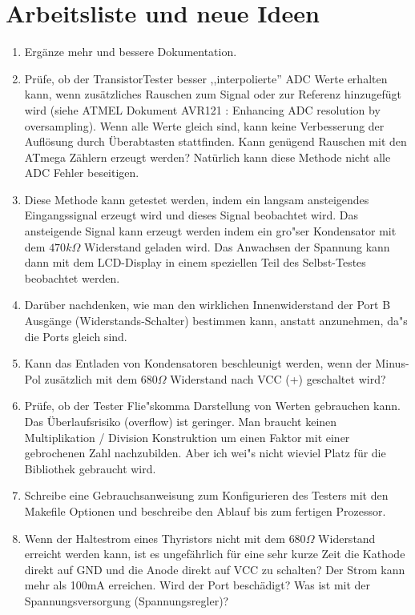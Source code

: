 
\chapter{Arbeitsliste und neue Ideen}
\label{sec:todo}

\begin{enumerate}
\item Erg\"anze mehr und bessere Dokumentation.
\item Pr\"ufe, ob der TransistorTester besser ,,interpolierte''  ADC Werte erhalten kann, wenn zus\"atz\-liches Rauschen zum Signal
oder zur Referenz hinzugef\"ugt wird (siehe ATMEL Dokument AVR121 \cite{AVR121}: Enhancing ADC resolution by oversampling).
Wenn alle Werte gleich sind, kann keine Verbesserung der Aufl\"osung durch \"Uberabtasten stattfinden.
Kann gen\"ugend Rauschen mit den ATmega Z\"ahlern erzeugt werden?
Nat\"urlich kann diese Methode nicht alle ADC Fehler beseitigen.
\item Diese Methode kann getestet werden, indem ein langsam ansteigendes Eingangssignal erzeugt wird und dieses
Signal beobachtet wird.
Das ansteigende Signal kann erzeugt werden indem ein gro"ser Kondensator mit dem \(470k\Omega\) Widerstand geladen wird.
Das Anwachsen der Spannung kann dann mit dem LCD-Display in einem speziellen Teil des Selbst-Testes beobachtet werden.
\item Dar\"uber nachdenken, wie man den wirklichen Innenwiderstand der Port B Aus\-g\"an\-ge (Wider\-stands-Schal\-ter) bestimmen kann,
anstatt anzunehmen, da"s die Ports gleich sind.
\item Kann das Entladen von Kondensatoren beschleunigt werden, wenn der Minus-Pol zus\"atzlich mit dem \(680\Omega\) 
Widerstand nach VCC (+) geschaltet wird?
\item Pr\"ufe, ob der Tester Flie"skomma Darstellung von Werten gebrauchen kann.
Das \"Uberlaufsrisiko (overflow) ist geringer.
Man braucht keinen Multiplikation / Division Konstruktion um einen Faktor mit einer gebrochenen Zahl nachzubilden.
Aber ich wei"s nicht wieviel Platz f\"ur die Bibliothek gebraucht wird.
\item Schreibe eine Gebrauchsanweisung zum Konfigurieren des Testers mit den Makefile Optionen und beschreibe
den Ablauf bis zum fertigen Prozessor.
\item Wenn der Haltestrom eines Thyristors nicht mit dem \(680\Omega\) Widerstand erreicht werden kann, 
ist es ungef\"ahrlich f\"ur eine sehr kurze Zeit die Kathode direkt auf GND und die Anode direkt auf VCC zu schalten?
Der Strom kann mehr als 100mA erreichen. Wird der Port besch\"adigt? Was ist mit der Spannungsversorgung (Spannungsregler)?

\end{enumerate}
